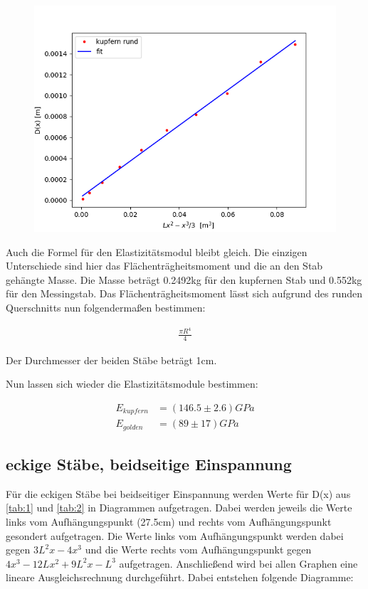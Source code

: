 \begin{figure}[H]
    \centering
    \includegraphics{kre.png}
\end{figure}

\noindent Auch die Formel für den Elastizitätsmodul bleibt gleich. Die einzigen Unterschiede sind hier das Flächenträgheitsmoment und die an den Stab gehängte Masse. Die Masse beträgt 0.2492kg für den kupfernen Stab und 0.552kg für den Messingstab. Das Flächenträgheitsmoment lässt sich aufgrund des runden Querschnitts nun folgendermaßen bestimmen:

\begin{align*}
    \frac{\pi R^4}{4}
\end{align*}

\noindent Der Durchmesser der beiden Stäbe beträgt 1cm.

\noindent Nun lassen sich wieder die Elastizitätsmodule bestimmen:

\begin{align*}
    E_{kupfern} &= (146.5\pm 2.6) GPa \\
    E_{golden} &= (89\pm 17) GPa 
\end{align*}

\subsection{eckige Stäbe, beidseitige Einspannung}

Für die eckigen Stäbe bei beidseitiger Einspannung werden Werte für D(x) aus \ref{tab:1} und \ref{tab:2} in Diagrammen aufgetragen. Dabei werden jeweils die Werte links vom Aufhängungspunkt (27.5cm) und rechts vom Aufhängungspunkt gesondert aufgetragen. Die Werte links vom Aufhängungspunkt werden dabei gegen $3L^2x-4x^3$ und die Werte rechts vom Aufhängungspunkt gegen $4x^3-12Lx^2+9L^2x-L^3$ aufgetragen. Anschließend wird bei allen Graphen eine lineare Ausgleichsrechnung durchgeführt. Dabei entstehen folgende Diagramme:


